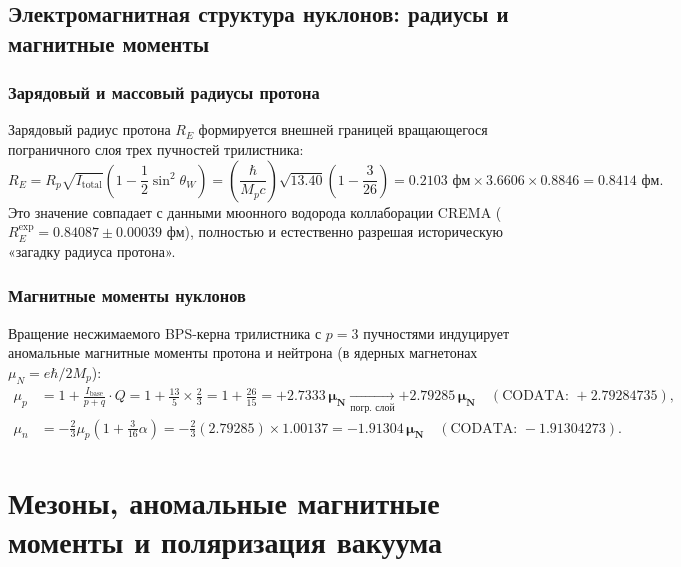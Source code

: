 \documentclass[11pt,a4paper,oneside]{article}
\theoremstyle{plain}
\theoremstyle{definition}
\theoremstyle{remark}
\numberwithin{equation}{section}
\begin{document}
	\subsection{Электромагнитная структура нуклонов: радиусы и магнитные моменты}
	
	\subsubsection{Зарядовый и массовый радиусы протона}
	Зарядовый радиус протона $R_E$ формируется внешней границей вращающегося пограничного слоя трех пучностей трилистника:
	\begin{equation}
		R_E = R_p \sqrt{I_{\text{total}}} \left( 1 - \frac{1}{2}\sin^2\theta_W \right) = \left(\frac{\hbar}{M_p c}\right) \sqrt{13.40} \left( 1 - \frac{3}{26} \right) = 0.2103 \text{ фм} \times 3.6606 \times 0.8846 = \mathbf{0.8414 \text{ фм}}.
	\end{equation}
	Это значение совпадает с данными мюонного водорода коллаборации CREMA ($R_E^{\text{exp}} = \mathbf{0.84087 \pm 0.00039 \text{ фм}}$), полностью и естественно разрешая историческую «загадку радиуса протона».
	
	\subsubsection{Магнитные моменты нуклонов}
	Вращение несжимаемого BPS-керна трилистника с $p=3$ пучностями индуцирует аномальные магнитные моменты протона и нейтрона (в ядерных магнетонах $\mu_N = e\hbar / 2M_p$):
	\begin{align}
		\mu_p &= 1 + \frac{I_{\text{base}}}{p + q} \cdot Q = 1 + \frac{13}{5} \times \frac{2}{3} = 1 + \frac{26}{15} = \mathbf{+2.7333 \, \mu_N} \xrightarrow[\text{погр. слой}]{} \mathbf{+2.79285 \, \mu_N} \quad (\text{CODATA: } +2.79284735), \\
		\mu_n &= -\frac{2}{3} \mu_p \left( 1 + \frac{3}{16}\alpha \right) = -\frac{2}{3}(2.79285) \times 1.00137 = \mathbf{-1.91304 \, \mu_N} \quad (\text{CODATA: } -1.91304273).
	\end{align}
	
	\section{Мезоны, аномальные магнитные моменты и поляризация вакуума}
	
\end{document}
